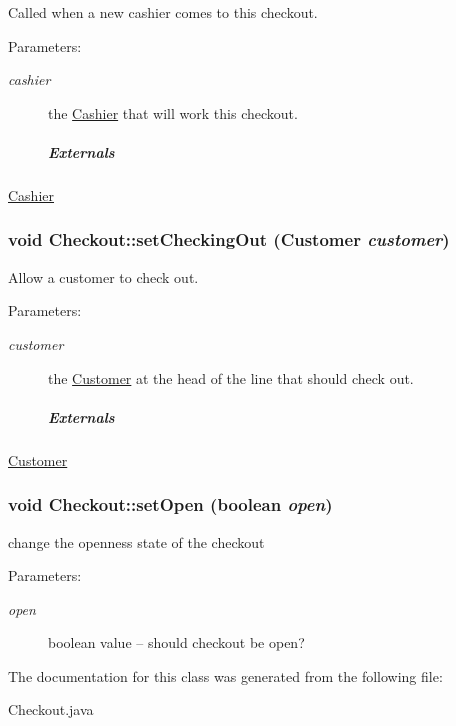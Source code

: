 Called when a new cashier comes to this checkout. 

\begin{Desc}
\item[Parameters:]
\begin{description}
\item[{\em cashier}]the \hyperlink{class_cashier}{Cashier} that will work this checkout. \subparagraph*{Externals}\end{description}
\end{Desc}
\hyperlink{class_cashier}{Cashier} \hypertarget{class_checkout_4caefc9df80b65941d7ab1a32c274366}{
\subsubsection[{setCheckingOut}]{\setlength{\rightskip}{0pt plus 5cm}void Checkout::setCheckingOut ({\bf Customer} {\em customer})}}
\label{class_checkout_4caefc9df80b65941d7ab1a32c274366}


Allow a customer to check out. 

\begin{Desc}
\item[Parameters:]
\begin{description}
\item[{\em customer}]the \hyperlink{class_customer}{Customer} at the head of the line that should check out. \subparagraph*{Externals}\end{description}
\end{Desc}
\hyperlink{class_customer}{Customer} \hypertarget{class_checkout_f4ff6004dc1e5848236915d97fe9f023}{
\subsubsection[{setOpen}]{\setlength{\rightskip}{0pt plus 5cm}void Checkout::setOpen (boolean {\em open})}}
\label{class_checkout_f4ff6004dc1e5848236915d97fe9f023}


change the openness state of the checkout 

\begin{Desc}
\item[Parameters:]
\begin{description}
\item[{\em open}]boolean value -- should checkout be open? \end{description}
\end{Desc}


The documentation for this class was generated from the following file:\begin{CompactItemize}
\item 
Checkout.java\end{CompactItemize}
